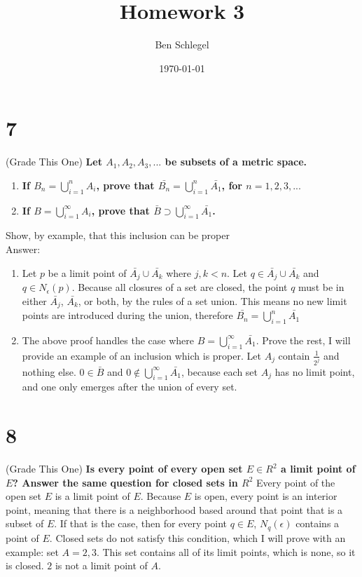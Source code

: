 \documentclass{article}
\author{Ben Schlegel
}
\title{Homework 3}
\date{\today}
\begin{document}
\maketitle

\section* {7} (Grade This One)
\noindent \textbf{Let $A_1, A_2, A_3,...$ be subsets of a metric space.}
\begin{enumerate}[label=(\alph*)]
    \item\textbf{If $B_n = \bigcup^n_{i=1} A_i$, prove that $\bar{B_n} = \bigcup^n_{i=1} \bar{A_1}$, for $n = 1,2,3, ...$ }
    \item\textbf{If $B = \bigcup^\infty_{i=1} A_i$, prove that $\bar{B} \supset \bigcup^\infty_{i=1} \bar{A_1}$.}
\end{enumerate}
Show, by example, that this inclusion can be proper\\
Answer:
\begin{enumerate}[label=(\alph*)]
    \item Let $p$ be a limit point of $\bar{A_j} \cup \bar{A_k}$ where $j,k < n$. Let $q \in \bar{A_j} \cup \bar{A_k}$ and $q \in N_\epsilon(p)$. Because all closures of a set are closed, the point $q$ must be in either $\bar{A_j}$, $\bar{A_k}$, or both, by the rules of a set union. This means no new limit points are introduced during the union, therefore  $\bar{B_n} = \bigcup^n_{i=1} \bar{A_1}$
    \item The above proof handles the case where $B = \bigcup^\infty_{i=1} \bar{A_1}$. Prove the rest, I will provide an example of an inclusion which is proper. Let $A_j$ contain $\frac{1}{2^j}$ and nothing else. $0 \in \bar{B}$ and $0 \notin \bigcup^\infty_{i=1} \bar{A_1}$, because each set $A_j$ has no limit point, and one only emerges after the union of every set.
\end{enumerate}

\section*{8} (Grade This One)
\noindent \textbf{Is every point of every open set $E \in R^2$ a limit point of $E$? Answer the same question for closed sets in $R^2$}
Every point of the open set $E$ is a limit point of $E$. Because $E$ is open, every point is an interior point, meaning that there is a neighborhood based around that point that is a subset of $E$. If that is the case, 
then for every point $q \in E$, $N_q(\epsilon)$ contains a point of $E$. Closed sets do not satisfy this condition, which I will prove with an example: set $A = {2,3}$. This set contains all of its limit points, which is none, so it is closed.
$2$ is not a limit point of $A$.
\end{document}
